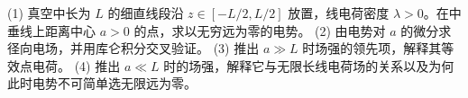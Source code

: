 (1) 真空中长为 \(L\) 的细直线段沿 \(z\in[-L/2,L/2]\) 放置，线电荷密度 \(\lambda>0\)。在中垂线上距离中心 \(a>0\) 的点，求以无穷远为零的电势。
(2) 由电势对 \(a\) 的微分求径向电场，并用库仑积分交叉验证。
(3) 推出 \(a\gg L\) 时场强的领先项，解释其等效点电荷。
(4) 推出 \(a\ll L\) 时的场强，解释它与无限长线电荷场的关系以及为何此时电势不可简单选无限远为零。
